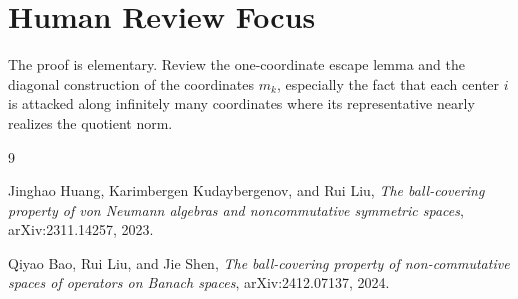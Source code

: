 \documentclass[11pt]{article}
\begin{document}
\section*{Human Review Focus}

The proof is elementary.  Review the one-coordinate escape lemma and the
diagonal construction of the coordinates \(m_k\), especially the fact that
each center \(i\) is attacked along infinitely many coordinates where its
representative nearly realizes the quotient norm.

\begin{thebibliography}{9}

Jinghao Huang, Karimbergen Kudaybergenov, and Rui Liu,
\emph{The ball-covering property of von Neumann algebras and noncommutative
symmetric spaces},
arXiv:2311.14257, 2023.

Qiyao Bao, Rui Liu, and Jie Shen,
\emph{The ball-covering property of non-commutative spaces of operators on
Banach spaces},
arXiv:2412.07137, 2024.

\end{thebibliography}
\end{document}
